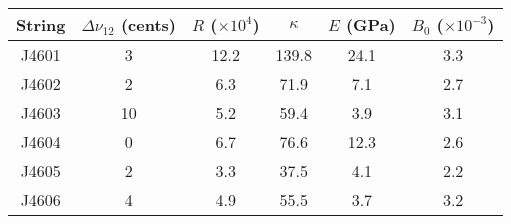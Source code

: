 \begin{tabular}{cccccc}
\toprule
String &  $\Delta \nu_{12}$ (cents) &  $R$ ($\times 10^4$) &  $\kappa$ &  $E$ (GPa) &  $B_0$ ($\times 10^{-3}$) \\
\midrule
 J4601 &                          3 &                 12.2 &     139.8 &       24.1 &                       3.3 \\
 J4602 &                          2 &                  6.3 &      71.9 &        7.1 &                       2.7 \\
 J4603 &                         10 &                  5.2 &      59.4 &        3.9 &                       3.1 \\
 J4604 &                          0 &                  6.7 &      76.6 &       12.3 &                       2.6 \\
 J4605 &                          2 &                  3.3 &      37.5 &        4.1 &                       2.2 \\
 J4606 &                          4 &                  4.9 &      55.5 &        3.7 &                       3.2 \\
\bottomrule
\end{tabular}


